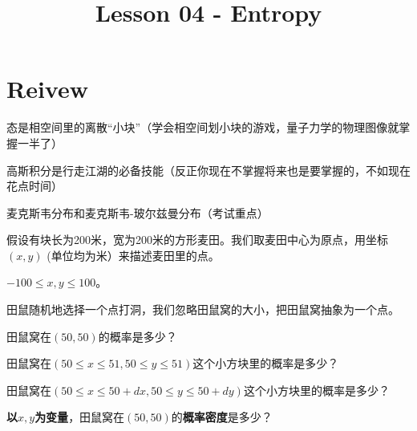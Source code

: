 \documentclass[CJK]{beamer}
\title{Lesson 04 - Entropy}
\author{}
\date{}
\begin{document}

\section{Reivew}

\begin{frame}
\bch
\bitem
\item{态是相空间里的离散“小块”（学会相空间划小块的游戏，量子力学的物理图像就掌握一半了）}
\item{高斯积分是行走江湖的必备技能（反正你现在不掌握将来也是要掌握的，不如现在花点时间）}
\item{麦克斯韦分布和麦克斯韦-玻尔兹曼分布（考试重点）}
\eitem
\ech
\end{frame}


\begin{frame}
\bch
假设有块长为200米，宽为200米的方形麦田。我们取麦田中心为原点，用坐标$(x, y)$ (单位均为米）来描述麦田里的点。

$-100\le x, y \le 100$。



田鼠随机地选择一个点打洞，我们忽略田鼠窝的大小，把田鼠窝抽象为一个点。
\ech
\end{frame}


\begin{frame}
\bch


田鼠窝在$(50, 50)$的概率是多少？

\ech
\end{frame}


\begin{frame}
\bch


田鼠窝在$(50\le x \le 51, 50\le y \le 51)$这个小方块里的概率是多少？

\ech
\end{frame}


\begin{frame}
\bch


田鼠窝在$(50\le x \le 50+dx, 50\le y \le 50+dy)$这个小方块里的概率是多少？
\ech
\end{frame}

\begin{frame}
\bch


{\bf 以$x, y$为变量}，田鼠窝在$(50, 50)$的{\bf 概率密度}是多少？

\ech
\end{frame}
\end{document}
